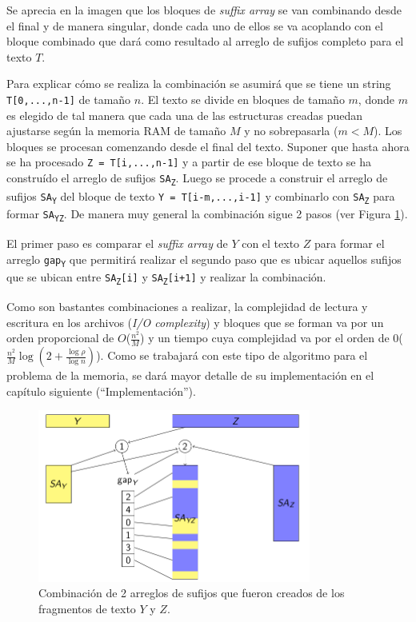 Se aprecia en la imagen que los bloques de \textit{suffix array} se van combinando desde el final y de manera singular, donde cada uno de ellos se va acoplando con el bloque combinado que dará como resultado al arreglo de sufijos completo para el texto $T$.

Para explicar cómo se realiza la combinación se asumirá que se tiene un string \texttt{T[0,...,n-1]} de tamaño $n$. El texto se divide en bloques de tamaño $m$, donde $m$ es elegido de tal manera que cada una de las estructuras creadas puedan ajustarse según la memoria RAM de tamaño $M$ y no sobrepasarla ($m<M$). Los bloques se procesan comenzando desde el final del texto. Suponer que hasta ahora se ha procesado \texttt{Z = T[i,...,n-1]} y a partir de ese bloque de texto se ha construído el arreglo de sufijos \texttt{SA\textsubscript{Z}}. Luego se procede a construir el arreglo de sufijos \texttt{SA\textsubscript{Y}} del bloque de texto \texttt{Y = T[i-m,...,i-1]} y combinarlo con \texttt{SA\textsubscript{Z}} para formar \texttt{SA\textsubscript{YZ}}. De manera muy general la combinación sigue 2 pasos (ver Figura \ref{fig:comb2}).

El primer paso es comparar el \textit{suffix array} de $Y$ con el texto $Z$ para formar el arreglo \texttt{gap\textsubscript{Y}} que permitirá realizar el segundo paso que es ubicar aquellos sufijos que se ubican entre \texttt{SA\textsubscript{Z}[i]} y \texttt{SA\textsubscript{Z}[i+1]} y realizar la combinación.

Como son bastantes combinaciones a realizar, la complejidad de lectura y escritura en los archivos (\textit{I/O complexity}) y bloques que se forman va por un orden proporcional de $O$($\frac{n^{2}}{M}$) y un tiempo cuya complejidad va por el orden de 0($\frac{n^{2}}{M} \log (2 + \frac{\log \rho}{\log n})$). Como se trabajará con este tipo de algoritmo para el problema de la memoria, se dará mayor detalle de su implementación en el capítulo siguiente (``Implementación'').

\begin{figure}[h]
    \centering
    \includegraphics[width=0.8\textwidth]{./images/combinacion2bloques.png}
    \caption{Combinación de 2 arreglos de sufijos que fueron creados de los fragmentos de texto $Y$ y $Z$.}
    \label{fig:comb2}
\end{figure}


